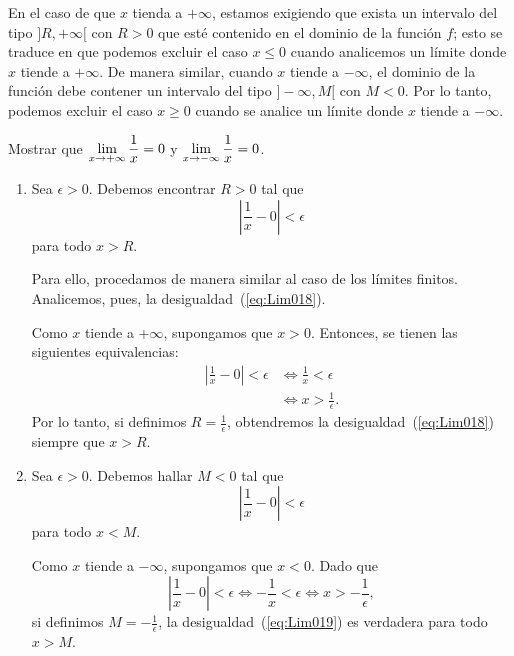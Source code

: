 En el caso de que $x$ tienda a $+\infty$, estamos exigiendo que exista un intervalo del tipo
$]R,+\infty[$ con $R > 0$ que esté contenido en el dominio de la función $f$; esto se traduce en
que podemos excluir el caso $x \leq 0$ cuando analicemos un límite donde $x$ tiende a $+\infty$. De
manera similar, cuando $x$ tiende a $-\infty$, el dominio de la función debe contener un intervalo
del tipo $]-\infty,M[$ con $M < 0$. Por lo tanto, podemos excluir el caso $x\geq 0$ cuando se
analice un límite donde $x$ tiende a $-\infty$.

\begin{exemplo}[Solución]{%
Mostrar que $\displaystyle\limjc{\frac{1}{x}}{x}{+\infty} = 0$ y
$\displaystyle\limjc{\frac{1}{x}}{x}{-\infty} = 0$.
}%
\begin{enumerate}[leftmargin=*]
\item Sea $\epsilon > 0$. Debemos encontrar $R > 0$ tal que
      \begin{equation}
      \label{eq:Lim018}
        \left\lvert\frac{1}{x} - 0\right\rvert < \epsilon
      \end{equation}
      para todo $x > R$.

      Para ello, procedamos de manera similar al caso de los límites finitos. Analicemos, pues,
      la desigualdad~(\ref{eq:Lim018}).

      Como $x$ tiende a $+\infty$, supongamos que $x > 0$. Entonces, se tienen las siguientes
      equivalencias:
      \begin{align*}
      \left|\frac{1}{x} - 0\right| < \epsilon &\Longleftrightarrow
      \frac{1}{x} < \epsilon \\
      &\Longleftrightarrow x > \frac{1}{\epsilon}.
      \end{align*}
      Por lo tanto, si definimos $R = \frac{1}{\epsilon}$, obtendremos la
      desigualdad~(\ref{eq:Lim018}) siempre que $x > R$.

\item Sea $\epsilon > 0$. Debemos hallar $M < 0$ tal que
      \begin{equation}
      \label{eq:Lim019}
        \left\lvert\frac{1}{x} - 0\right\rvert < \epsilon
      \end{equation}
      para todo $x < M$.

      Como $x$ tiende a $-\infty$, supongamos que $x < 0$. Dado que
      \[
        \left\lvert\frac{1}{x} - 0\right\rvert < \epsilon \Longleftrightarrow
        -\frac{1}{x} < \epsilon \Longleftrightarrow x > -\frac{1}{\epsilon},
      \]
      si definimos $M = -\frac{1}{\epsilon}$, la desigualdad~(\ref{eq:Lim019}) es verdadera
      para todo $x > M$.
\end{enumerate}
\end{exemplo}

